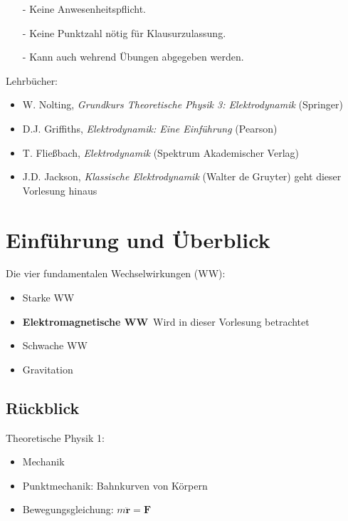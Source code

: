 \documentclass[titlepage,11pt,a4paper,ngerman]{report}
\renewcommand{\vec}[1]{\boldsymbol{#1}}
\newcommand{\lcom}[1]{\color{MidnightBlue}#1\color{black}}
\begin{document}
\begin{tcolorbox}[colback=white,colframe=black,fonttitle=\bfseries,title=Hinweis zu den Übungen,sharp corners,tcbox raise base]
	\begin{itemize}
		\item[-] Keine Anwesenheitspflicht.
		\item[-] Keine Punktzahl nötig für Klausurzulassung.
		\item[-] Kann auch wehrend Übungen abgegeben werden.
	\end{itemize}
\end{tcolorbox}
\noindent
Lehrbücher: 
\begin{itemize}
	\item W. Nolting, \textit{Grundkurs Theoretische Physik 3: Elektrodynamik} (Springer)
	\item D.J. Griffiths, \textit{Elektrodynamik: Eine Einführung} (Pearson) 
	\item T. Fließbach, \textit{Elektrodynamik} (Spektrum Akademischer Verlag)
	\item J.D. Jackson, \textit{Klassische Elektrodynamik} (Walter de Gruyter) \lcom{geht dieser Vorlesung hinaus}
\end{itemize}

\section{Einführung und Überblick}

Die vier fundamentalen Wechselwirkungen (WW):
\begin{itemize}
	\item Starke WW
	\item \textbf{Elektromagnetische WW}\  \lcom{Wird in dieser Vorlesung betrachtet}
	\item Schwache WW
	\item Gravitation
\end{itemize}

\subsection{Rückblick}
Theoretische Physik 1: 
\begin{itemize}
	\item Mechanik 
	\item Punktmechanik: Bahnkurven von Körpern
	\item Bewegungsgleichung: $m \vec{\ddot r} = \vec{F}$
\end{itemize}
\end{document}
